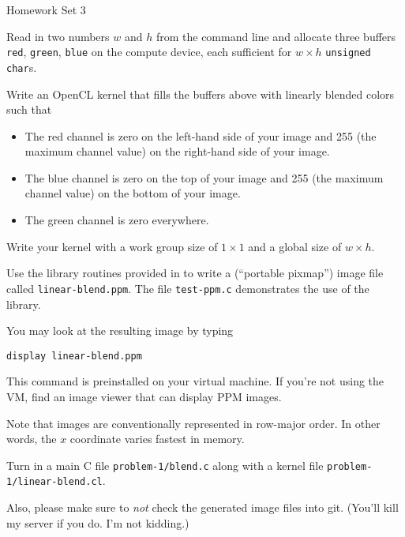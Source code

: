 \documentclass[11pt]{article}
\begin{document}
%
{Homework Set 3}

\bigskip
{}

Read in two numbers $w$ and $h$ from the command line and allocate three
buffers \texttt{red}, \texttt{green}, \texttt{blue} on the compute
device, each sufficient for $w\times h$ \texttt{unsigned char}s.


Write an OpenCL kernel that fills the buffers above with
linearly blended colors such that
\begin{itemize}
  \item The red channel is zero on the left-hand side of your
    image and 255 (the maximum channel value) on the right-hand side
    of your image.
  \item The blue channel is zero on the top of your
    image and 255 (the maximum channel value) on the bottom
    of your image.
  \item The green channel is zero everywhere.
\end{itemize}
Write your kernel with a work group size of $1\times 1$ and a
global size of $w\times h$.

Use the library routines provided in
 to
write a 
(``portable pixmap'') image file called \texttt{linear-blend.ppm}.
The file \texttt{test-ppm.c} demonstrates the use of the library.

You may look at the resulting image by typing
\begin{lstlisting}
display linear-blend.ppm
\end{lstlisting}

This command is preinstalled on your virtual machine. If you're not
using the VM, find an image viewer that can display PPM images.

Note that images are conventionally represented in row-major
order. In other words, the $x$ coordinate varies fastest in
memory.

Turn in a main C file \texttt{problem-1/blend.c} along with
a kernel file \texttt{problem-1/linear-blend.cl}.

Also, please make sure to \emph{not} check the generated image files
into git. (You'll kill my server if you do. I'm not kidding.)

\bigskip
{}
\end{document}
